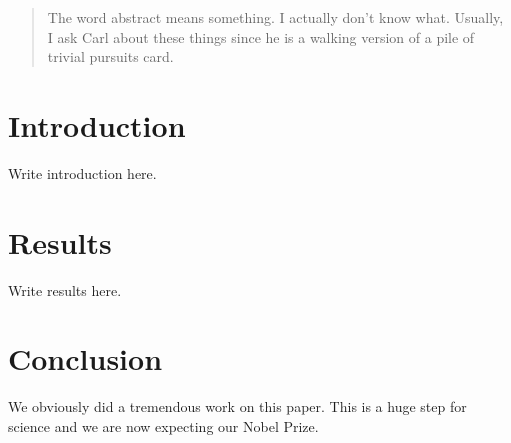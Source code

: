 \documentclass{article}
\begin{document}
\begin{abstract}
The word abstract means something. I actually don't know what.
Usually, I ask Carl about these things since he is a walking version
of a pile of trivial pursuits card.

\end{abstract}

\section{Introduction}

Write introduction here.

\section{Results}

Write results here.

\section{Conclusion}

We obviously did a tremendous work on this paper. This is a huge step for science and we are now expecting our Nobel Prize.
\end{document}
